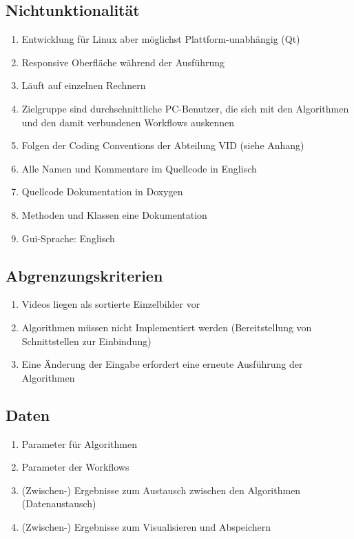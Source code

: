 \subsection{Nichtunktionalität}
\begin{enumerate}[ align=left, label={\textbf{\textbackslash NF1\arabic*0\textbackslash}} ]
\item Entwicklung für Linux aber möglichst Plattform-unabhängig (Qt)
\item Responsive Oberfläche während der Ausführung
\item Läuft auf einzelnen Rechnern
\item Zielgruppe sind durchschnittliche PC-Benutzer, die sich mit den Algorithmen und den damit
verbundenen Workflows auskennen
\item Folgen der Coding Conventions der Abteilung VID (siehe Anhang)
\item Alle Namen und Kommentare im Quellcode in Englisch
\item Quellcode Dokumentation in Doxygen
\item Methoden und Klassen eine Dokumentation
\item Gui-Sprache: Englisch
\end{enumerate}


\subsection{Abgrenzungskriterien}
\begin{enumerate}[ align=left, label={\textbf{\textbackslash AK1\arabic*0\textbackslash}}]
\item Videos liegen als sortierte Einzelbilder vor
\item Algorithmen müssen nicht Implementiert werden
(Bereitstellung von Schnittstellen zur Einbindung)
\item Eine Änderung der Eingabe erfordert eine erneute Ausführung der Algorithmen
\end{enumerate}

\subsection{Daten}
\begin{enumerate}[ align=left, label={\textbf{\textbackslash D1\arabic*0\textbackslash}}]
\item Parameter für Algorithmen
\item Parameter der Workflows
\item (Zwischen-) Ergebnisse zum Austausch zwischen den Algorithmen (Datenaustausch)
\item (Zwischen-) Ergebnisse zum Visualisieren und Abspeichern
\end{enumerate}


